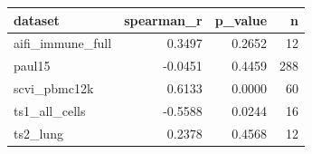 \begin{tabular}{lrrr}
\toprule
dataset & spearman\_r & p\_value & n \\
\midrule
aifi\_immune\_full & 0.3497 & 0.2652 & 12 \\
paul15 & -0.0451 & 0.4459 & 288 \\
scvi\_pbmc12k & 0.6133 & 0.0000 & 60 \\
ts1\_all\_cells & -0.5588 & 0.0244 & 16 \\
ts2\_lung & 0.2378 & 0.4568 & 12 \\
\bottomrule
\end{tabular}

